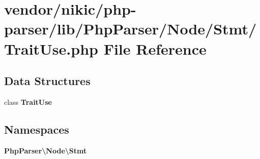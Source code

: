 \section{vendor/nikic/php-\/parser/lib/\+Php\+Parser/\+Node/\+Stmt/\+Trait\+Use.php File Reference}
\label{_trait_use_8php}
\subsection*{Data Structures}
\begin{DoxyCompactItemize}
\item 
class {\bf Trait\+Use}
\end{DoxyCompactItemize}
\subsection*{Namespaces}
\begin{DoxyCompactItemize}
\item 
 {\bf Php\+Parser\textbackslash{}\+Node\textbackslash{}\+Stmt}
\end{DoxyCompactItemize}
